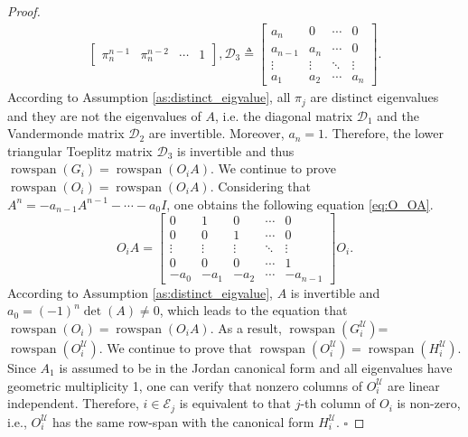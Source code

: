 \documentclass[12pt]{article}  %
\newcommand{\Ec}{{\mathcal{E}}} %
\newcommand{\Uc}{{\mathcal{U}}}
\DeclareMathOperator{\rs}{{rowspan}}
\newtheorem*{proof}{\textbf{Proof}}
\begin{document}
\begin{proof}
\begin{align*}
\begin{bmatrix}
\pi_n^{n-1} & \pi_n^{n-2} & \cdots  & 1
\end{bmatrix}, 
\mathcal{D}_3\triangleq
\begin{bmatrix}
a_n & 0 & \cdots &   0 \\
a_{n-1} & a_n & \cdots &   0 \\
\vdots & \vdots & \ddots  & \vdots \\
a_1 & a_2 & \cdots  & a_n 
\end{bmatrix}.
\end{align*}
According to Assumption \ref{as:distinct_eigvalue}, all $\pi_j$ are distinct eigenvalues and they are not the eigenvalues of $A$, i.e. the diagonal matrix $\mathcal{D}_1$ and the Vandermonde matrix $\mathcal{D}_2$ are invertible. Moreover, $a_n=1$. Therefore, the lower triangular Toeplitz matrix $\mathcal{D}_3$ is invertible and thus $\rs(G_i)=\rs(O_i A)$. 		
We continue to prove $\rs(O_i)=\rs(O_i A)$. Considering that $A^n=-a_{n-1}A^{n-1}-\cdots-a_0 I$, one obtains the following equation \eqref{eq:O_OA}.
\begin{equation}
\label{eq:O_OA}
O_i A=
\begin{bmatrix}
0 & 1 & 0 &  \cdots & 0 \\
0 & 0 & 1 &  \cdots & 0 \\
\vdots & \vdots & \vdots & \ddots & \vdots \\
0 & 0 & 0 &  \cdots & 1 \\
-a_0 & -a_1 & -a_2 & \cdots &  -a_{n-1}
\end{bmatrix}
O_i .
\end{equation}	%
According to Assumption \ref{as:distinct_eigvalue}, $A$ is invertible and $a_0=(-1)^n\det(A)\neq 0$, which leads to the equation that $\rs(O_i)=\rs(O_i A)$.
As a result, $\rs(G_i^\Uc)$=$\rs(O_i^\Uc)$. We continue to prove that $\rs(O_i^\Uc)=\rs(H_i^\Uc).$
Since $A_1$ is assumed to be in the Jordan canonical form and all eigenvalues have geometric multiplicity 1, one can verify that nonzero columns of $O^\Uc_i$ are linear independent. Therefore, $i\in\Ec_j$ is equivalent to that $j$-th column of $O_i$ is non-zero, i.e., $O^\Uc_i$ has the same row-span with the canonical form $H^\Uc_i$.
$\square$
\end{proof}
\end{document}
